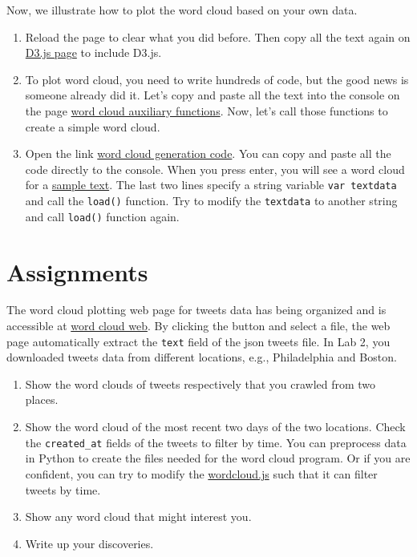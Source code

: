 \documentclass[a4paper, 11pt]{article}
\begin{document}
Now, we illustrate how to plot the word cloud based on your own data.
\begin{enumerate}
\item Reload the page to clear what you did before. Then copy all the text again on \href{https://raw.githubusercontent.com/mbostock/d3/master/d3.min.js}{D3.js page} to include D3.js.
\item To plot word cloud, you need to write hundreds of code, but the good news is someone already did it. Let's copy and paste all the text into the console on the page \href{http://nymph332088.github.io/CIS4340/labassignments/Lab5/auxiliary_functions.js}{word cloud auxiliary functions}. Now, let's call those functions to create a simple word cloud. 
\item Open the link \href{http://nymph332088.github.io/CIS4340/labassignments/Lab5/wordcloudgeneration.js}{word cloud generation code}. You can copy and paste all the code directly to the console. When you press enter, you will see a word cloud for a \href{http://www.jasondavies.com/wordtree/cat-in-the-hat.txt}{sample text}. The last two lines specify a string variable \texttt{var textdata} and call the \texttt{load()} function. Try to modify the \texttt{textdata} to another string and call \texttt{load()} function again. 
\end{enumerate}



\section{Assignments}
The word cloud plotting web page for tweets data has being organized and is accessible at \href{http://nymph332088.github.io/CIS4340/labassignments/Lab5/wordcloud.html}{word cloud web}. By clicking the button and select a file, the web page automatically extract the \texttt{text} field of the json tweets file.
In Lab 2, you downloaded tweets data from different locations, e.g., Philadelphia and Boston.
\begin{enumerate}
\item Show the word clouds of tweets respectively that you crawled from two places.
\item Show the word cloud of the most recent two days of the two locations. Check the \texttt{created\_at} fields of the tweets to filter by time. You can preprocess data in Python to create the files needed for the word cloud program. Or if you are confident, you can try to modify the \href{file:///home/nymph/nymph332088.github.io/CIS4340/labassignments/Lab5/wordcloud.js}{wordcloud.js} such that it can filter tweets by time.
\item Show any word cloud that might interest you.
\item Write up your discoveries.
\end{enumerate}
\end{document}
